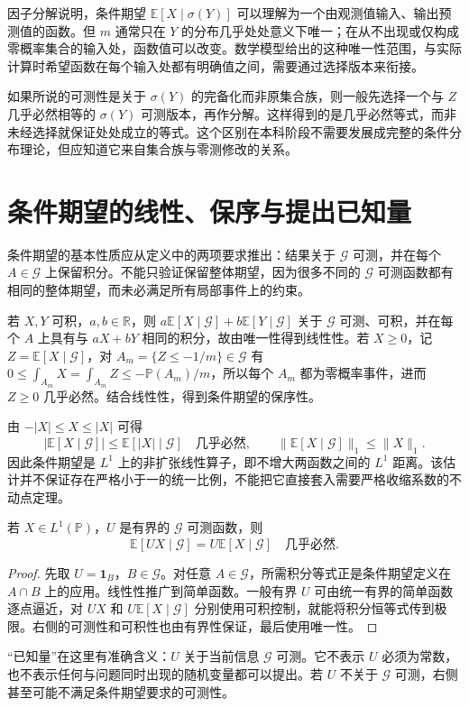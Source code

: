 \documentclass[UTF8,12pt,a4paper,fontset=fandol]{ctexbook}
\begin{document}
因子分解说明，条件期望 $\mathbb E[X\mid\sigma(Y)]$ 可以理解为一个由观测值输入、输出预测值的函数。但 $m$ 通常只在 $Y$ 的分布几乎处处意义下唯一；在从不出现或仅构成零概率集合的输入处，函数值可以改变。数学模型给出的这种唯一性范围，与实际计算时希望函数在每个输入处都有明确值之间，需要通过选择版本来衔接。

如果所说的可测性是关于 $\sigma(Y)$ 的完备化而非原集合族，则一般先选择一个与 $Z$ 几乎必然相等的 $\sigma(Y)$ 可测版本，再作分解。这样得到的是几乎必然等式，而非未经选择就保证处处成立的等式。这个区别在本科阶段不需要发展成完整的条件分布理论，但应知道它来自集合族与零测修改的关系。

\section{条件期望的线性、保序与提出已知量}
条件期望的基本性质应从定义中的两项要求推出：结果关于 $\mathcal G$ 可测，并在每个 $A\in\mathcal G$ 上保留积分。不能只验证保留整体期望，因为很多不同的 $\mathcal G$ 可测函数都有相同的整体期望，而未必满足所有局部事件上的约束。

若 $X,Y$ 可积，$a,b\in\mathbb R$，则
$a\mathbb E[X\mid\mathcal G]+b\mathbb E[Y\mid\mathcal G]$
关于 $\mathcal G$ 可测、可积，并在每个 $A$ 上具有与 $aX+bY$ 相同的积分，故由唯一性得到线性性。若 $X\geq0$，记 $Z=\mathbb E[X\mid\mathcal G]$，对 $A_m=\{Z\leq-1/m\}\in\mathcal G$ 有
$0\leq\int_{A_m}X=\int_{A_m}Z\leq-\mathbb P(A_m)/m$，所以每个 $A_m$ 都为零概率事件，进而 $Z\geq0$ 几乎必然。结合线性性，得到条件期望的保序性。

由 $-|X|\leq X\leq|X|$ 可得
\[
 |\mathbb E[X\mid\mathcal G]|
 \leq\mathbb E[|X|\mid\mathcal G]\quad\text{几乎必然},
 \qquad
 \|\mathbb E[X\mid\mathcal G]\|_1\leq\|X\|_1.
\]
因此条件期望是 $L^1$ 上的非扩张线性算子，即不增大两函数之间的 $L^1$ 距离。该估计并不保证存在严格小于一的统一比例，不能把它直接套入需要严格收缩系数的不动点定理。

\begin{proposition}[提出已知量的有界版本]
若 $X\in L^1(\mathbb P)$，$U$ 是有界的 $\mathcal G$ 可测函数，则
\[
 \mathbb E[UX\mid\mathcal G]=U\mathbb E[X\mid\mathcal G]
 \quad\text{几乎必然}.
\]
\end{proposition}
\begin{proof}
先取 $U=\mathbf1_B$，$B\in\mathcal G$。对任意 $A\in\mathcal G$，所需积分等式正是条件期望定义在 $A\cap B$ 上的应用。线性性推广到简单函数。一般有界 $U$ 可由统一有界的简单函数逐点逼近，对 $UX$ 和 $U\mathbb E[X\mid\mathcal G]$ 分别使用可积控制，就能将积分恒等式传到极限。右侧的可测性和可积性也由有界性保证，最后使用唯一性。
\end{proof}
“已知量”在这里有准确含义：$U$ 关于当前信息 $\mathcal G$ 可测。它不表示 $U$ 必须为常数，也不表示任何与问题同时出现的随机变量都可以提出。若 $U$ 不关于 $\mathcal G$ 可测，右侧甚至可能不满足条件期望要求的可测性。
\end{document}
